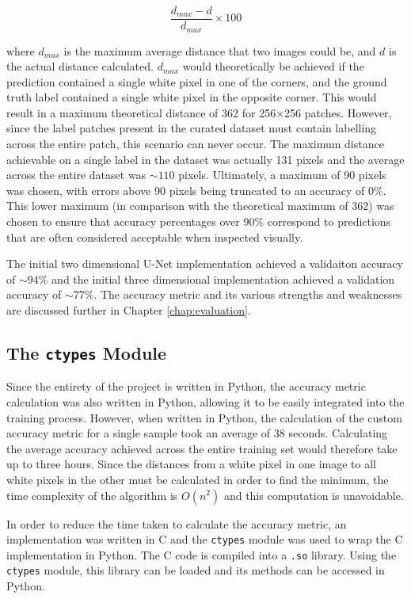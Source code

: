 \begin{equation*}
    \frac{d_{max} - {d}}{d_{max}} \times 100
\end{equation*}

where $d_{max}$ is the maximum average distance that two images could be, and $d$ is the actual distance calculated. $d_{max}$ would theoretically be achieved if the prediction contained a single white pixel in one of the corners, and the ground truth label contained a single white pixel in the opposite corner. This would result in a maximum theoretical distance of 362 for 256$\times$256 patches. However, since the label patches present in the curated dataset must contain labelling across the entire patch, this scenario can never occur. The maximum distance achievable on a single label in the dataset was actually 131 pixels and the average across the entire dataset was ${\sim}110$ pixels. Ultimately, a maximum of 90 pixels was chosen, with errors above 90 pixels being truncated to an accuracy of 0\%. This lower maximum (in comparison with the theoretical maximum of 362) was chosen to ensure that accuracy percentages over 90\% correspond to predictions that are often considered acceptable when inspected visually.

The initial two dimensional U-Net implementation achieved a validaiton accuracy of ${\sim}94\%$ and the initial three dimensional implementation achieved a validation accuracy of ${\sim}$77\%. The accuracy metric and its various strengths and weaknesses are discussed further in Chapter \ref{chap:evaluation}.

\subsection{The \texttt{ctypes} Module}

Since the entirety of the project is written in Python, the accuracy metric calculation was also written in Python, allowing it to be easily integrated into the training process. However, when written in Python, the calculation of the custom accuracy metric for a single sample took an average of 38 seconds. Calculating the average accuracy achieved across the entire training set would therefore take up to three hours. Since the distances from a white pixel in one image to all white pixels in the other must be calculated in order to find the minimum, the time complexity of the algorithm is $O(n^2)$ and this computation is unavoidable.

In order to reduce the time taken to calculate the accuracy metric, an implementation was written in C and the \texttt{ctypes} module was used to wrap the C implementation in Python. The C code is compiled into a \texttt{.so} library. Using the \texttt{ctypes} module, this library can be loaded and its methods can be accessed in Python. 

